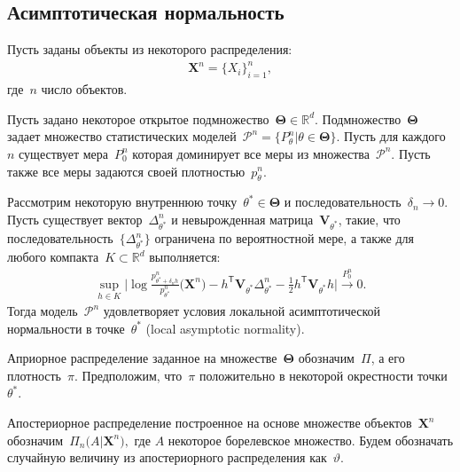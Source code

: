 \documentclass[../main.tex]{subfiles}
\begin{document}
\subsection{Асимптотическая нормальность}
Пусть заданы объекты из некоторого распределения:
\[
\begin{aligned}
\textbf{X}^{n} = \{X_i\}_{i=1}^{n},
\end{aligned}
\]
где~$n$ число объектов.

Пусть задано некоторое открытое подмножество~$\bm{\Theta}\in\mathbb{R}^d$. Подмножество~$\bm{\Theta}$ задает множество статистических моделей~$\mathcal{P}^{n} = \{P_{\theta}^{n}| \theta \in \bm{\Theta}\}.$ Пусть для каждого~$n$ существует мера~$P_{0}^{n}$ которая доминирует все меры из множества~$\mathcal{P}^{n}$. Пусть также все меры задаются своей плотностью~$p_{\theta}^{n}$.

\begin{definition}
\label{def:lan}
Рассмотрим некоторую внутреннюю точку~$\theta^{*}\in \bm{\Theta}$ и последовательность~$\delta_{n} \to 0$. Пусть существует вектор~$\Delta^{n}_{\theta^{*}}$ и невырожденная матрица~$\textbf{V}_{\theta^{*}}$, такие, что последовательность~$\{\Delta^{n}_{\theta^{*}}\}$ ограничена по вероятностной мере, а также для любого компакта~$K \subset \mathbb{R}^{d}$ выполняется:
\[
\begin{aligned}
\sup_{h\in K}\bigr|\log\frac{p^{n}_{\theta^{*}+\delta_{n}h}}{p^{n}_{\theta^{*}}}\bigr(\textbf{X}^{n}\bigr) -h^{\mathsf{T}}\textbf{V}_{\theta^{*}}\Delta^{n}_{\theta^*} - \frac{1}{2}h^{\mathsf{T}}\textbf{V}_{\theta^*}h\bigr| \overset{P_0^{n}}{\to} 0.
\end{aligned}
\]
Тогда модель~$\mathcal{P}^{n}$ удовлетворяет условия локальной асимптотической нормальности в точке~$\theta^*$ (local asymptotic normality).
\end{definition}

Априорное распределение заданное на множестве~$\bm{\Theta}$ обозначим~$\Pi$, а его плотность~$\pi$. Предположим, что~$\pi$ положительно в некоторой окрестности точки~$\theta^*$.

Апостериорное распределение построенное на основе множестве объектов~$\textbf{X}^{n}$ обозначим~$\Pi_{n}\bigr(A|\textbf{X}^{n}\bigr),$ где $A$ некоторое борелевское множество. Будем обозначать случайную величину из апостериорного распределения как~$\vartheta$.
\end{document}
